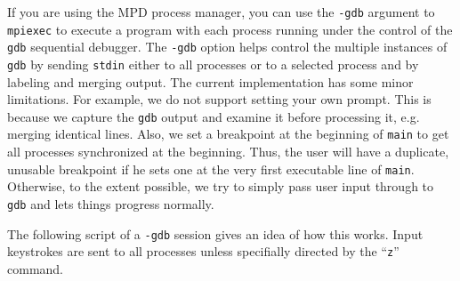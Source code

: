 \documentclass[dvipdfm,11pt]{article}
\begin{document}
If you are using the MPD process manager, you can use the \texttt{-gdb}
argument to \texttt{mpiexec} to execute a program with each process
running under the control of the \texttt{gdb} sequential debugger.
The \texttt{-gdb} option helps control the multiple instances of
\texttt{gdb} by sending \texttt{stdin} either to all processes or to
a selected process and by labeling and merging output.  The current
implementation has some minor limitations.  For example, we do not
support setting your own prompt.  This is because we capture the \texttt{gdb}
output and examine it before processing it, e.g. merging identical lines.
Also, we set a breakpoint at the beginning of \texttt{main} to get all
processes synchronized at the beginning.  Thus, the user will have a
duplicate, unusable breakpoint if he sets one at the very first executable
line of \texttt{main}.  Otherwise, to the extent possible, we try to simply
pass user input through to \texttt{gdb} and lets things progress normally.

The following script of a \texttt{-gdb} session gives an idea of how
this works.  Input keystrokes are sent to all processes unless specifially
directed by the ``\texttt{z}'' command.
\end{document}
